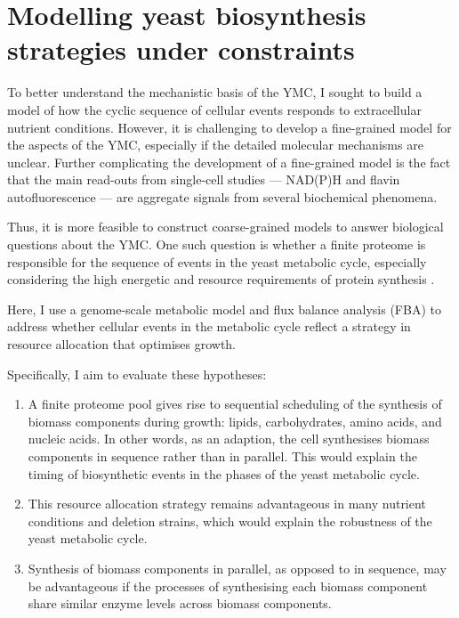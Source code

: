 \chapter{Modelling yeast biosynthesis strategies under constraints}
\label{ch:model}

To better understand the mechanistic basis of the YMC, I sought to build a model of how the cyclic sequence of cellular events responds to extracellular nutrient conditions.
However, it is challenging to develop a fine-grained model for the aspects of the YMC,
especially if the detailed molecular mechanisms are unclear.
Further complicating the development of a fine-grained model is the fact that the main read-outs from single-cell studies --- NAD(P)H and flavin autofluorescence --- are aggregate signals from several biochemical phenomena.

Thus, it is more feasible to construct coarse-grained models to answer biological questions about the YMC\@.
One such question is whether a finite proteome is responsible for the sequence of events in the yeast metabolic cycle, especially considering the high energetic and resource requirements of protein synthesis \parencite{oneillEukaryoticCellBiology2020,zylstraMetabolicDynamicsCell2022}.

Here, I use a genome-scale metabolic model and flux balance analysis (FBA) to address whether cellular events in the metabolic cycle reflect a strategy in resource allocation that optimises growth.

\pagebreak

Specifically, I aim to evaluate these hypotheses:
\begin{enumerate}
  \item A finite proteome pool gives rise to sequential scheduling of the synthesis of biomass components during growth: lipids, carbohydrates, amino acids, and nucleic acids.
        In other words, as an adaption, the cell synthesises biomass components in sequence rather than in parallel.
        This would explain the timing of biosynthetic events in the phases of the yeast metabolic cycle.
  \item This resource allocation strategy remains advantageous in many nutrient conditions and deletion strains,
        which would explain the robustness of the yeast metabolic cycle.
  \item Synthesis of biomass components in parallel, as opposed to in sequence, may be advantageous if the processes of synthesising each biomass component share similar enzyme levels across biomass components.
\end{enumerate}


